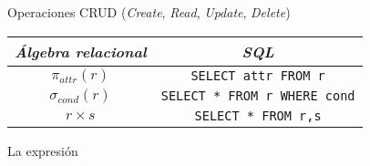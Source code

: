 \documentclass[a4paper, twoside]{article}
\newcommand{\codedir}{../resources/code} %
\begin{document}
Operaciones CRUD (\emph{Create}, \emph{Read}, \emph{Update}, \emph{Delete})

\begin{center}
	\begin{tabular}{|c|c|}
		\hline 
		\emph{Álgebra relacional} & \emph{SQL}\\
		\hline 
		\hline 
		$\pi_{attr}(r)$ & \texttt{SELECT attr FROM r}\\
		\hline 
		$\sigma_{cond}(r)$ & \texttt{SELECT {*} FROM r WHERE cond}\\
		\hline 
		$r\times s$ & \texttt{SELECT {*} FROM r,s}\\
		\hline 
	\end{tabular}
\end{center}

La expresión

\end{document}
